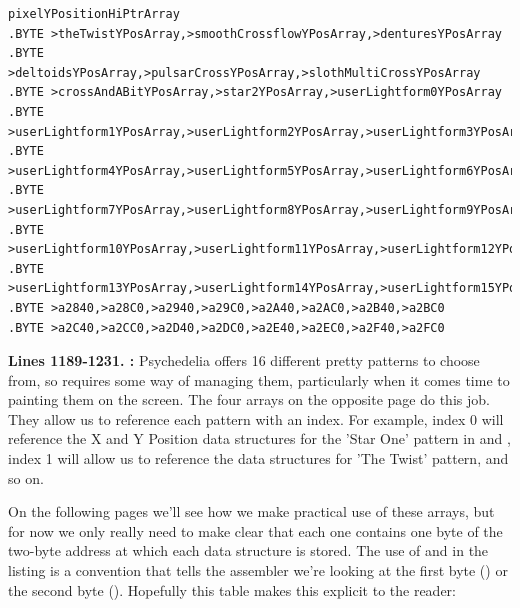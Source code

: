 \begin{lstlisting}
pixelYPositionHiPtrArray   
.BYTE >theTwistYPosArray,>smoothCrossflowYPosArray,>denturesYPosArray
.BYTE >deltoidsYPosArray,>pulsarCrossYPosArray,>slothMultiCrossYPosArray
.BYTE >crossAndABitYPosArray,>star2YPosArray,>userLightform0YPosArray
.BYTE >userLightform1YPosArray,>userLightform2YPosArray,>userLightform3YPosArray
.BYTE >userLightform4YPosArray,>userLightform5YPosArray,>userLightform6YPosArray
.BYTE >userLightform7YPosArray,>userLightform8YPosArray,>userLightform9YPosArray
.BYTE >userLightform10YPosArray,>userLightform11YPosArray,>userLightform12YPosArray
.BYTE >userLightform13YPosArray,>userLightform14YPosArray,>userLightform15YPosArray
.BYTE >a2840,>a28C0,>a2940,>a29C0,>a2A40,>a2AC0,>a2B40,>a2BC0
.BYTE >a2C40,>a2CC0,>a2D40,>a2DC0,>a2E40,>a2EC0,>a2F40,>a2FC0
\end{lstlisting}
\clearpage

\textbf{Lines 1189-1231. :} Psychedelia
offers 16 different pretty patterns to choose from, so requires some way of managing them, particularly
when it comes time to painting them on the screen. The four arrays on the opposite page do this job.
They allow us to reference each pattern with an index. For example, index 0 will reference the X and
Y Position data structures for the 'Star One' pattern in  and 
, index 1 will allow us to reference the data structures for 'The Twist' pattern,
and so on.

On the following pages we'll see how we make practical use of these arrays, but for now we only really
need to make clear that each one contains one byte of the two-byte address at which each
data structure is stored. The use of \icode{<} and \icode{>} in the listing is a convention that
tells the assembler we're looking at the first byte (\icode{>}) or the second byte (\icode{<}).
Hopefully this table makes this explicit to the reader:

